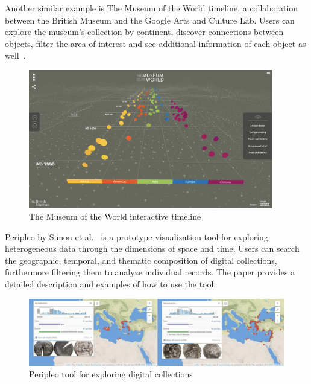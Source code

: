 Another similar example is The Museum of the World timeline, a collaboration between the British Museum and
the Google Arts and Culture Lab. Users can explore the museum’s collection by continent, discover connections between objects, filter
the area of interest and see additional information of each object as well~\citep{britishmuseumworld}.

\begin{figure}[hbt!]
    \begin{center}
        \includegraphics[width=0.95\textwidth]{graphics/2-literature-review/20}
    \end{center}
    \caption{The Museum of the World interactive timeline}
    \label{fig:figure2.20}
\end{figure}

Peripleo by Simon et al.~\citep{simon2016peripleo} is a prototype visualization tool for exploring heterogeneous data through the dimensions
of space and time. Users can search the geographic, temporal, and thematic composition of digital collections, furthermore filtering them to
analyze individual records. The paper provides a detailed description and examples of how to use the tool.

\begin{figure}[hbt!]
    \begin{center}
        \includegraphics[width=\textwidth]{graphics/2-literature-review/21}
    \end{center}
    \caption{Peripleo tool for exploring digital collections}
    \label{fig:figure2.21}
\end{figure}

